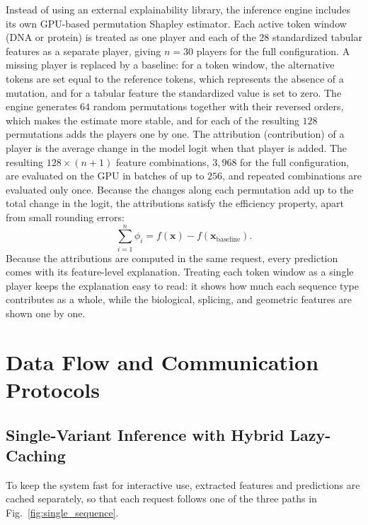Instead of using an external explainability library, the inference engine includes its own GPU-based permutation Shapley estimator. Each active token window (DNA or protein) is treated as one player and each of the $28$ standardized tabular features as a separate player, giving $n = 30$ players for the full configuration. A missing player is replaced by a baseline: for a token window, the alternative tokens are set equal to the reference tokens, which represents the absence of a mutation, and for a tabular feature the standardized value is set to zero. The engine generates $64$ random permutations together with their reversed orders, which makes the estimate more stable, and for each of the resulting $128$ permutations adds the players one by one. The attribution (contribution) of a player is the average change in the model logit when that player is added. The resulting $128 \times (n + 1)$ feature combinations, $3{,}968$ for the full configuration, are evaluated on the GPU in batches of up to $256$, and repeated combinations are evaluated only once. Because the changes along each permutation add up to the total change in the logit, the attributions satisfy the efficiency property, apart from small rounding errors:
\[
    \sum_{i=1}^{n} \phi_i = f(\mathbf{x}) - f(\mathbf{x}_{\text{baseline}}).
\]
Because the attributions are computed in the same request, every prediction comes with its feature-level explanation. Treating each token window as a single player keeps the explanation easy to read: it shows how much each sequence type contributes as a whole, while the biological, splicing, and geometric features are shown one by one.

\section{Data Flow and Communication Protocols}
\label{sec:data_flow}

\subsection{Single-Variant Inference with Hybrid Lazy-Caching}

To keep the system fast for interactive use, extracted features and predictions are cached separately, so that each request follows one of the three paths in Fig.~\ref{fig:single_sequence}.

